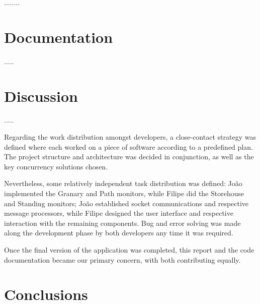 \documentclass[12pt]{article}
\begin{document}
........


\newpage
\section{Documentation} %

.....

\newpage
\section{Discussion} %

.....

Regarding the work distribution amongst developers, a close-contact strategy was defined where each worked on a piece of software according to a predefined plan. 
The project structure and architecture was decided in conjunction, as well as the key concurrency solutions chosen.

Nevertheless, some relatively independent task distribution was defined: João implemented the Granary and Path monitors, while Filipe did the Storehouse and 
Standing monitors; João established socket communications and respective message processors, while Filipe designed the user interface and respective interaction
with the remaining components.
Bug and error solving was made along the development phase by both developers any time it was required.

Once the final version of the application was completed, this report and the code documentation became our primary concern, with both contributing equally.


\newpage
\section{Conclusions} %
\end{document}
